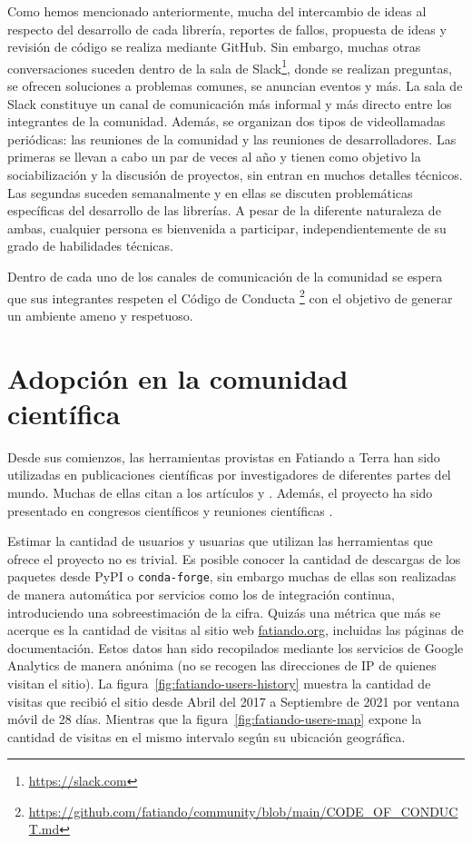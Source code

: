 Como hemos mencionado anteriormente, mucha del intercambio de ideas al respecto
del desarrollo de cada librería, reportes de fallos, propuesta de ideas
y revisión de código se realiza mediante GitHub.
Sin embargo, muchas otras conversaciones suceden dentro de la sala de
Slack\footnote{\url{https://slack.com}}, donde se realizan preguntas, se
ofrecen soluciones a problemas comunes, se anuncian eventos y más.
La sala de Slack constituye un canal de comunicación más informal y más
directo entre los integrantes de la comunidad.
Además, se organizan dos tipos de videollamadas periódicas: las reuniones de la
comunidad y las reuniones de desarrolladores.
Las primeras se llevan a cabo un par de veces al año y tienen como objetivo la
sociabilización y la discusión de proyectos, sin entran en muchos detalles
técnicos.
Las segundas suceden semanalmente y en ellas se discuten problemáticas
específicas del desarrollo de las librerías.
A pesar de la diferente naturaleza de ambas, cualquier persona es bienvenida
a participar, independientemente de su grado de habilidades técnicas.

Dentro de cada uno de los canales de comunicación de la comunidad se espera
que sus integrantes respeten el Código de
Conducta%
\footnote{%
    \url{https://github.com/fatiando/community/blob/main/CODE_OF_CONDUCT.md}%
}
con el objetivo de generar un ambiente ameno y respetuoso.



\section{Adopción en la comunidad científica}

Desde sus comienzos, las herramientas provistas en Fatiando a Terra han sido
utilizadas en publicaciones científicas por investigadores de diferentes partes
del mundo.
Muchas de ellas citan a los artículos \citet{uieda2013} y \citet{verde2018}.
Además, el proyecto ha sido presentado en congresos científicos y reuniones
científicas \citep{uieda2013,uieda2020b,soler2021c}.

Estimar la cantidad de usuarios y usuarias que utilizan las herramientas que
ofrece el proyecto no es trivial.
Es posible conocer la cantidad de descargas de los paquetes desde PyPI
o \texttt{conda-forge}, sin embargo muchas de ellas son realizadas de manera
automática por servicios como los de integración continua, introduciendo una
sobreestimación de la cifra.
Quizás una métrica que más se acerque es la cantidad de visitas al sitio web
\href{https://fatiando.org}{fatiando.org}, incluidas las páginas de
documentación.
Estos datos han sido recopilados mediante los servicios de Google Analytics de
manera anónima (no se recogen las direcciones de IP de quienes visitan el
sitio).
La figura~\ref{fig:fatiando-users-history} muestra la cantidad de visitas que
recibió el sitio desde Abril del 2017 a Septiembre de 2021 por ventana móvil de
28 días.
Mientras que la figura~\ref{fig:fatiando-users-map} expone la cantidad de
visitas en el mismo intervalo según su ubicación geográfica.


